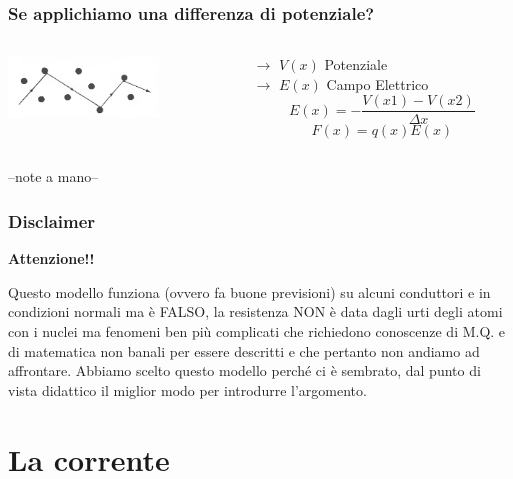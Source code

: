 		
		\begin{frame}[c]\frametitle{Se applichiamo una differenza di potenziale?}
			\begin{columns}
				\begin{column}{0.4\textwidth}
					\includegraphics[width=4cm]{./img/path.png}
				\end{column}
				\begin{column}{0.7\textwidth}

					$\longrightarrow$ $V(x)$ Potenziale\\
					$\longrightarrow$ $E(x)$ Campo Elettrico
					\[
					 E (x) = - \frac{V(x1)-V(x2)}{\Delta x}
					\]
					\[
					 F \left(x\right) = q \left(x\right) E(x)
					\]

				\end{column}
			\end{columns}
			--note a mano--
		\end{frame}

		\begin{frame}[c]\frametitle{Disclaimer}
		    
		\begin{center}
			\color{red}\textbf{Attenzione!!}
		\end{center}
		Questo modello funziona (ovvero fa buone previsioni) su alcuni conduttori e in condizioni normali ma è FALSO, la resistenza NON è data dagli urti degli atomi con i nuclei ma fenomeni ben più complicati che richiedono conoscenze di M.Q. e di matematica non banali per essere descritti e che pertanto non andiamo ad affrontare. Abbiamo scelto questo modello perché ci è sembrato, dal punto di vista didattico il miglior modo per introdurre l'argomento.		
		\end{frame}

	\section{La corrente} %
	\label{sec:la_corrente}
	

